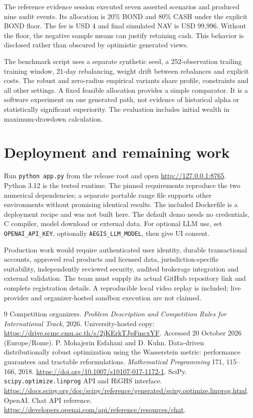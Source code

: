 \documentclass[11pt,a4paper]{article}
\begin{document}
The reference evidence session executed seven asserted scenarios and produced nine audit events. Its allocation is 20\% BOND and 80\% CASH under the explicit BOND floor. The fee is USD 4 and final simulated NAV is USD 99,996. Without the floor, the negative sample means can justify retaining cash. This behavior is disclosed rather than obscured by optimistic generated views.

The benchmark script uses a separate synthetic seed, a 252-observation trailing training window, 21-day rebalancing, weight drift between rebalances and explicit costs. The robust and zero-radius empirical variants share profile, constraints and all other settings. A fixed feasible allocation provides a simple comparator. It is a software experiment on one generated path, not evidence of historical alpha or statistically significant superiority. The evaluation includes initial wealth in maximum-drawdown calculation.

\section{Deployment and remaining work}
Run \texttt{python app.py} from the release root and open \url{http://127.0.0.1:8765}. Python 3.12 is the tested runtime. The pinned requirements reproduce the two numerical dependencies; a separate portable range file supports other environments without promising identical results. The included Dockerfile is a deployment recipe and was not built here. The default demo needs no credentials, C compiler, model download or external data. For optional LLM use, set \texttt{OPENAI\_API\_KEY}, optionally \texttt{AEGIS\_LLM\_MODEL}, then give UI consent.

Production work would require authenticated user identity, durable transactional accounts, approved real products and licensed data, jurisdiction-specific suitability, independently reviewed security, audited brokerage integration and external validation. The team must supply its actual GitHub repository link and complete registration details. A reproducible local video replay is included; live provider and organizer-hosted sandbox execution are not claimed.

\begin{thebibliography}{9}
 Competition organizers. \emph{Problem Description and Competition Rules for International Track}, 2026. University-hosted copy: \url{https://drive.scmc.cmu.ac.th/s/2jKErkTJpFmcxYF}. Accessed 20 October 2026 (Europe/Rome).
 P. Mohajerin Esfahani and D. Kuhn. Data-driven distributionally robust optimization using the Wasserstein metric: performance guarantees and tractable reformulations. \emph{Mathematical Programming} 171, 115--166, 2018. \url{https://doi.org/10.1007/s10107-017-1172-1}.
 SciPy. \texttt{scipy.optimize.linprog} API and HiGHS interface. \url{https://docs.scipy.org/doc/scipy/reference/generated/scipy.optimize.linprog.html}.
 OpenAI. Chat API reference. \url{https://developers.openai.com/api/reference/resources/chat}.
\end{thebibliography}
\end{document}
